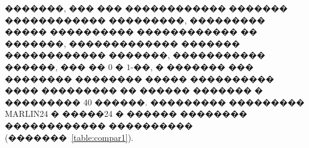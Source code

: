 \documentclass[11pt]{ubs}
\begin{document}
�������, ��� ��� ������������ ������� ������������ ���������, ��������� ����� ���������� ������������ �� �������, ������������� ������� ������������ �������, ����������� ������, ��� �� $0$ � $1$-��,  � ������� ��� �������� �������� ����� ���������� ���� ��������� �� ������ ������� � ��������� 40 ������. ��������� ��������� MARLIN24 � �����24 � ������ \cite{My9} �������� ������������ ���������� (�������~\ref{table:compar1}).
\begin{table}[tbph]
  \centering
  \caption{��������� ����������� ������������� ���������� ��� ��������� �������}
  \label{table:compar1}
\end{table}
\end{document}
